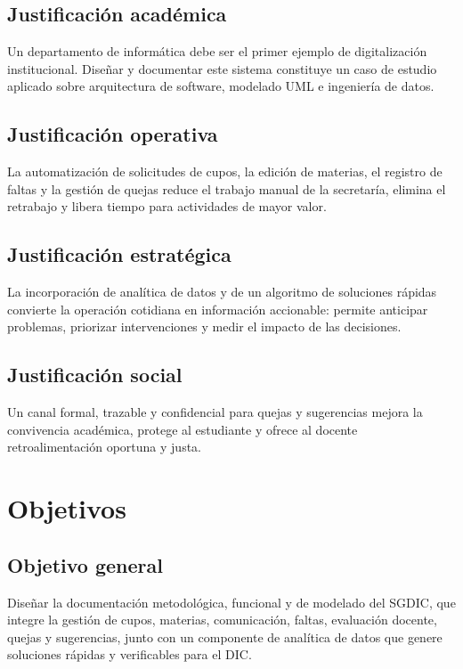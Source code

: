 \subsection{Justificación académica}
Un departamento de informática debe ser el primer ejemplo de digitalización
institucional. Diseñar y documentar este sistema constituye un caso de estudio
aplicado sobre arquitectura de software, modelado \ac{UML} e ingeniería de datos.

\subsection{Justificación operativa}
La automatización de solicitudes de cupos, la edición de materias, el registro
de faltas y la gestión de quejas reduce el trabajo manual de la secretaría,
elimina el retrabajo y libera tiempo para actividades de mayor valor.

\subsection{Justificación estratégica}
La incorporación de analítica de datos y de un algoritmo de soluciones rápidas
convierte la operación cotidiana en información accionable: permite anticipar
problemas, priorizar intervenciones y medir el impacto de las decisiones.

\subsection{Justificación social}
Un canal formal, trazable y confidencial para quejas y sugerencias mejora la
convivencia académica, protege al estudiante y ofrece al docente
retroalimentación oportuna y justa.

\section{Objetivos}

\subsection{Objetivo general}
\begin{cajaObjetivo}
Diseñar la documentación metodológica, funcional y de modelado del \ac{SGDIC},
que integre la gestión de cupos, materias, comunicación, faltas, evaluación
docente, quejas y sugerencias, junto con un componente de analítica de datos que
genere soluciones rápidas y verificables para el \ac{DIC}.
\end{cajaObjetivo}

